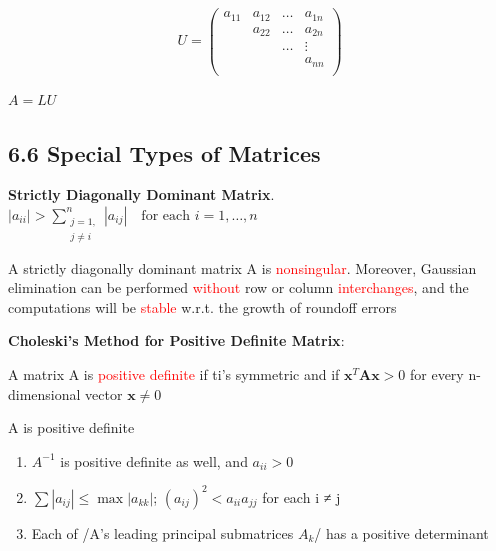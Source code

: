 \documentclass[11pt]{article}
\begin{document}
\begin{equation*}
U=
\begin{pmatrix}
a_{11}&a_{12}&\dots&a_{1n}\\
&a_{22}&\dots&a_{2n}\\
&&\dots&\vdots\\
&&&a_{nn}\\
\end{pmatrix}
\end{equation*}

\(A=LU\)
\subsection{6.6 Special Types of Matrices}
\label{sec:orgbcfae1b}
\textbf{Strictly Diagonally Dominant Matrix}.
\(|a_{ii}|>\displaystyle\sum_{\substack{j=1,\\j\neq i}}^n|a_{ij}| \quad
   \text{for each } i=1,\dots,n\)

\begin{theorem}
A strictly diagonally dominant matrix A is \textcolor{red}{nonsingular}. Moreover,
Gaussian elimination can be performed \textcolor{red}{without} row or column
\textcolor{red}{interchanges}, and the computations will be \textcolor{red}{stable}
w.r.t. the growth of roundoff errors
\end{theorem}

\textbf{Choleski's Method for Positive Definite Matrix}:
\begin{definition}
A matrix A is \textcolor{red}{positive definite} if ti's symmetric and if    
$ \mathbf{x}^T \mathbf{A} \mathbf{x}>0$ for every n-dimensional vector $ \mathbf{x}\neq 0$
\end{definition}

\begin{lemma}
A is positive definite
\begin{enumerate}
\item $A^{-1}$ is positive definite as well, and $a_{ii}>0$
\item $\sum|a_{ij}|\le\max|a_{kk}|$; $(a_{ij})^2<a_{ii}a_{jj}$ for each i ≠ j
\item Each of /A's leading principal submatrices $A_k$/ has a positive determinant
\end{enumerate}
\end{lemma}
\end{document}
